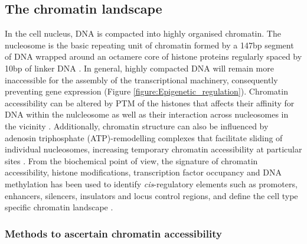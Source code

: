 

\subsection{The chromatin landscape}
In the cell nucleus, DNA is compacted into highly organised chromatin. The nucleosome is the basic repeating unit of chromatin formed by a 147bp segment of DNA wrapped around an octamere core of histone proteins regularly spaced by 10bp of linker DNA \parencite{Luger1997}. In general, highly compacted DNA will remain more inaccessible for the assembly of the transcriptional machinery, consequently preventing gene expression (Figure \ref{figure:Epigenetic_regulation}). Chromatin accessibility can be altered by PTM of the histones that affects their affinity for DNA within the nulcleosome as well as their interaction across nucleosomes in the vicinity \parencite{Polach2000,Pepenella2014}. Additionally, chromatin structure can also be influenced by adenosin triphosphate (ATP)-remodelling complexes that facilitate sliding of individual nucleosomes, increasing temporary chromatin accessibility at particular sites \parencite{Cosma1999}. From the biochemical point of view, the signature of chromatin accessibility, histone modifications, transcription factor occupancy and DNA methylation has been used to identify \textit{cis}-regulatory elements such as promoters, enhancers, silencers, insulators and locus control regions, and define the cell type specific chromatin landscape \parencite{Boyle2012,Kundaje2015}.





\subsubsection{Methods to ascertain chromatin accessibility}

